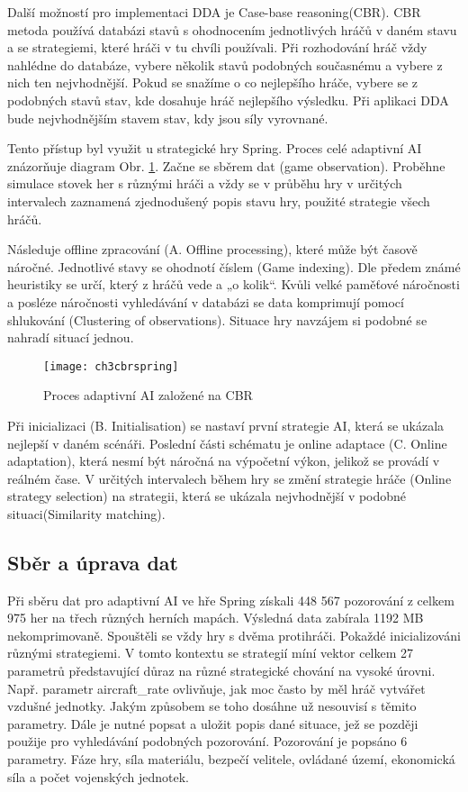 Další možností pro implementaci DDA je Case-base reasoning(CBR). CBR metoda používá databázi stavů s ohodnocením jednotlivých hráčů v daném stavu a se strategiemi, které hráči v tu chvíli používali. Při rozhodování hráč vždy nahlédne do databáze, vybere několik stavů podobných současnému a vybere z nich ten nejvhodnější. Pokud se snažíme o co nejlepšího hráče, vybere se z podobných stavů stav, kde dosahuje hráč nejlepšího výsledku. Při aplikaci DDA bude nejvhodnějším stavem stav, kdy jsou síly vyrovnané.

Tento přístup byl využit u strategické hry Spring. \cite{21cbr} Proces celé adaptivní AI znázorňuje diagram Obr. \ref{fig:ch3cbrspring}.
Začne se sběrem dat (game observation). Proběhne simulace stovek her s různými hráči a vždy se v průběhu hry v určitých intervalech zaznamená zjednodušený popis stavu hry, použité strategie všech hráčů. 

Následuje offline zpracování (A. Offline processing), které může být časově náročné. Jednotlivé stavy se ohodnotí číslem (Game indexing). Dle předem známé heuristiky se určí, který z hráčů vede a „o kolik“. Kvůli velké paměťové náročnosti a posléze náročnosti vyhledávání v databázi se data komprimují pomocí shlukování (Clustering of observations). Situace hry navzájem si podobné se nahradí situací jednou.
 
\begin{figure}
  \centering
  \texttt{[image: ch3cbrspring]}
	\caption{Proces adaptivní AI založené na CBR \cite{21cbr}}
	\label{fig:ch3cbrspring}
\end{figure}

Při inicializaci (B. Initialisation) se nastaví první strategie AI, která se ukázala nejlepší v daném scénáři. Poslední části schématu je online adaptace (C. Online adaptation), která nesmí být náročná na výpočetní výkon, jelikož se provádí v reálném čase. V určitých intervalech během hry se změní strategie hráče (Online strategy selection) na strategii, která se ukázala nejvhodnější v podobné situaci(Similarity matching).

\subsection{Sběr a úprava dat}

Při sběru dat pro adaptivní AI ve hře Spring získali 448 567 pozorování z celkem 975 her na třech různých herních mapách. Výsledná data zabírala 1192 MB nekomprimovaně. Spouštěli se vždy hry s dvěma protihráči. Pokaždé inicializováni různými strategiemi. V tomto kontextu se strategií míní vektor celkem 27 parametrů představující důraz na různé strategické chování na vysoké úrovni. Např. parametr aircraft\_rate ovlivňuje, jak moc často by měl hráč vytvářet vzdušné jednotky. Jakým způsobem se toho dosáhne už nesouvisí s těmito parametry. Dále je nutné popsat a uložit popis dané situace, jež se později použije pro vyhledávání podobných pozorování. Pozorování je popsáno 6 parametry. Fáze hry, síla materiálu, bezpečí velitele, ovládané území, ekonomická síla a počet vojenských jednotek.

